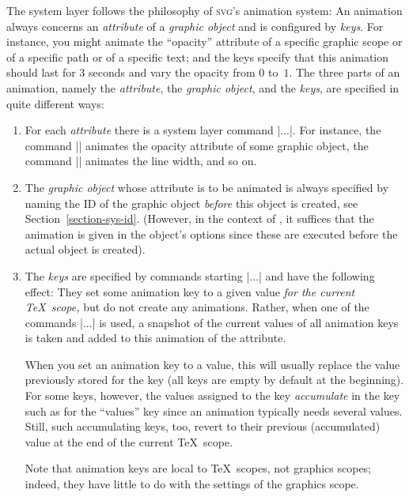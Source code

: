 The system layer follows the philosophy of \textsc{svg}'s animation
system: An animation always concerns an \emph{attribute} of a
\emph{graphic object} and is configured by \emph{keys}. For instance,
you might animate the ``opacity'' attribute of a specific graphic
scope or of a specific path or of a specific text; and the keys
specify that this animation should last for 3 seconds and vary the
opacity from $0$ to~$1$. The three parts of an animation, namely the
\emph{attribute}, the \emph{graphic object}, and the \emph{keys}, are
specified in quite different ways:

\begin{enumerate}
\item For each \emph{attribute} there is a system layer command
  |\pgfsys@animate...|. For instance, the command |\pgfsys@animateopacity|
  animates the opacity attribute of some graphic object, the command
  |\pgfsys@animatelinewidth| animates the line width, and so on.
\item The \emph{graphic object} whose attribute is to be animated is
  always specified by naming the ID of the graphic object
  \emph{before} this object is created, see
  Section~\ref{section-sys-id}. (However, in the context of
  \tikzname, it suffices that the animation is given in the object's
  options since these are executed before the actual object is
  created). 
\item The \emph{keys} are specified by commands starting
  |\pgfsys@animation@...| and have the following effect: They set some
  animation key to a given value \emph{for the current \TeX\ scope,}
  but do not create any animations. Rather, when one of the commands
  |\pgfsys@animate...| is used, a snapshot of the current values of
  all animation keys is taken and added to this animation of the
  attribute.

  When you set an animation key to a value, this will usually replace
  the value previously stored for the key (all keys are empty by
  default at the beginning). For some keys, however, the values
  assigned to the key \emph{accumulate} in the key such as for the
  ``values'' key since an animation typically needs several
  values. Still, such accumulating keys, too, revert to their previous
  (accumulated) value at the end of the current \TeX\ scope. 

  Note that animation keys are local to \TeX\ scopes, not graphics
  scopes; indeed, they have little to do with the settings of the
  graphics scope. 
\end{enumerate}

